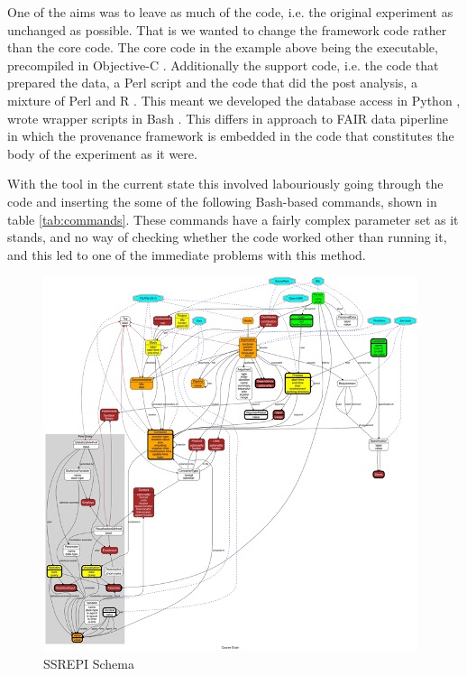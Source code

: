 \documentclass[runningheads]{llncs}
\begin{document}
One of the aims was to leave as much of the code, i.e. the original experiment
as unchanged as possible. That is we wanted to change the framework code rather
than the core code. The core code in the example above being the executable,
precompiled in Objective-C \cite{objectivec}. Additionally the support code, i.e. the
code that prepared the data, a Perl \cite{perl563} script and the code that did the
post analysis, a mixture of Perl and R \cite{R422}.  This meant we developed the
database access in Python \cite{python368}, wrote wrapper scripts in Bash \cite{bash4420}. This
differs in approach to FAIR data piperline \cite{mitchell2022fair} in which the provenance framework is
embedded in the code that constitutes the body of the experiment as it were.

With the tool in the current state this involved labouriously going through the
code and inserting the some of the following Bash-based commands, shown in
table \ref{tab:commands}. These commands have a fairly complex parameter set as
it stands, and no way of checking whether the code worked other than running
it, and this led to one of the immediate problems with this method.

\begin{figure}
\includegraphics[width=\textwidth]{img/schema.jpeg}
\caption{SSREPI Schema} \label{fig:schema}
\end{figure}
\end{document}
